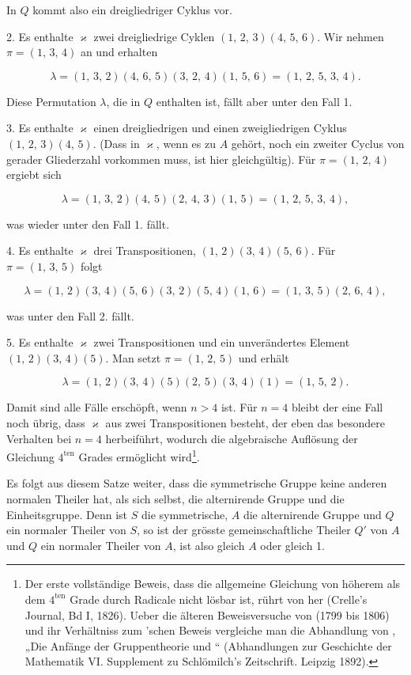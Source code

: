 
In $Q$ kommt also ein dreigliedriger Cyklus vor.

2. Es enthalte $\varkappa$ zwei dreigliedrige Cyklen $(1,\,2,\,3)(4,\,5,\,6)$. Wir nehmen $\pi = (1,\,3,\,4)$ an und erhalten

\[
\lambda = (1,\,3,\,2)(4,\,6,\,5)(3,\,2,\,4)(1,\,5,\,6) = (1,\,2,\,5,\,3,\,4).
\]

Diese Permutation $\lambda$, die in $Q$ enthalten ist, fällt aber unter den Fall 1.

3. Es enthalte $\varkappa$ einen dreigliedrigen und einen zweigliedrigen Cyklus $(1,\,2,\,3)(4,\,5)$. (Dass in $\varkappa$, wenn es zu $A$ gehört, noch ein zweiter Cyclus von gerader Gliederzahl vorkommen muss, ist hier gleichgültig). Für $\pi = (1,\,2,\,4)$ ergiebt sich

\[
\lambda = (1,\,3,\,2)(4,\,5)(2,\,4,\,3)(1,\,5) = (1,\,2,\,5,\,3,\,4),
\]

was wieder unter den Fall 1. fällt.

4. Es enthalte $\varkappa$ drei Transpositionen, $(1,\,2)(3,\,4)(5,\,6)$. Für $\pi = (1,\,3,\,5)$ folgt

\[
\lambda = (1,\,2)(3,\,4)(5,\,6)(3,\,2)(5,\,4)(1,\,6) = (1,\,3,\,5)(2,\,6,\,4),
\]

was unter den Fall 2. fällt.

5. Es enthalte $\varkappa$ zwei Transpositionen und ein unverändertes Element $(1,\,2)(3,\,4)(5)$. Man setzt $\pi = (1,\,2,\,5)$ und erhält

\[
\lambda = (1,\,2)(3,\,4)(5)(2,\,5)(3,\,4)(1) = (1,\,5,\,2).
\]

Damit sind alle Fälle erschöpft, wenn $n > 4$ ist. Für $n = 4$ bleibt der eine Fall noch übrig, dass $\varkappa$ aus zwei Transpositionen besteht, der eben das besondere Verhalten bei $n = 4$ herbeiführt, wodurch die algebraische Auflösung der Gleichung $4^{\text{ten}}$ Grades ermöglicht wird\footnote{Der erste vollständige Beweis, dass die allgemeine Gleichung von höherem als dem $4^{\text{ten}}$ Grade durch Radicale nicht lösbar ist, rührt von  her (Crelle's Journal, Bd I, 1826). Ueber die älteren Beweisversuche von  (1799 bis 1806) und ihr Verhältniss zum 'schen Beweis vergleiche man die Abhandlung von , „Die Anfänge der Gruppentheorie und `` (Abhandlungen zur Geschichte der Mathematik VI. Supplement zu Schlömilch's Zeitschrift. Leipzig 1892).}.

Es folgt aus diesem Satze weiter, dass die symmetrische Gruppe keine anderen normalen Theiler hat, als sich selbst, die alternirende Gruppe und die Einheitsgruppe. Denn ist $S$ die symmetrische, $A$ die alternirende Gruppe und $Q$ ein normaler Theiler von $S$, so ist der grösste gemeinschaftliche Theiler $Q'$ von $A$ und $Q$ ein normaler Theiler von $A$, ist also gleich $A$ oder gleich 1.
